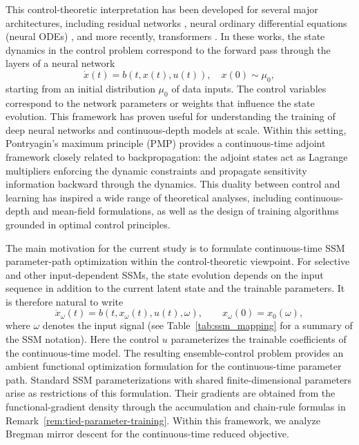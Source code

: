 \documentclass[11pt]{amsart}
\numberwithin{equation}{section} %
\theoremstyle{remark}
\begin{document}
This control-theoretic interpretation has been developed for several major architectures, including residual networks \cite{han2019mean,li2018optimal}, neural ordinary differential equations (neural ODEs) \cite{li2018maximum,ruiz2023neural}, and more recently, transformers \cite{kan2025optimal,zhang2024optimal}. In these works, the state dynamics in the control problem correspond to the forward pass through the layers of a neural network
\[
    \dot{x}(t) = b(t, x(t), u(t)), \quad x(0) \sim \mu_0,
\]
starting from an initial distribution $\mu_0$ of data inputs. The control variables correspond to the network parameters or weights that influence the state evolution.
This framework has proven useful for understanding the training of deep neural networks and continuous-depth models at scale. Within this setting, Pontryagin’s maximum principle (PMP) provides a continuous-time adjoint framework closely related to backpropagation: the adjoint states act as Lagrange multipliers enforcing the dynamic constraints and propagate sensitivity information backward through the dynamics.
This duality between control and learning has inspired a wide range of theoretical analyses, including continuous-depth and mean-field formulations, as well as the design of training algorithms grounded in optimal control principles.

\medskip

The main motivation for the current study is to formulate continuous-time SSM parameter-path optimization within the control-theoretic viewpoint. For selective and other input-dependent SSMs, the state evolution depends on the input sequence in addition to the current latent state and the trainable parameters. It is therefore natural to write
\[
\dot x_\omega(t) = b(t,x_\omega(t),u(t),\omega), 
\qquad x_\omega(0) = x_0(\omega),
\]
where $\omega$ denotes the input signal (see Table~\ref{tab:ssm_mapping} for a summary of the SSM notation). 
Here the control $u$ parameterizes the trainable coefficients of the continuous-time model. The resulting ensemble-control problem provides an ambient functional optimization formulation for the continuous-time parameter path. Standard SSM parameterizations with shared finite-dimensional parameters arise as restrictions of this formulation. Their gradients are obtained from the functional-gradient density through the accumulation and chain-rule formulas in Remark~\ref{rem:tied-parameter-training}. Within this framework, we analyze Bregman mirror descent for the continuous-time reduced objective.
\end{document}
